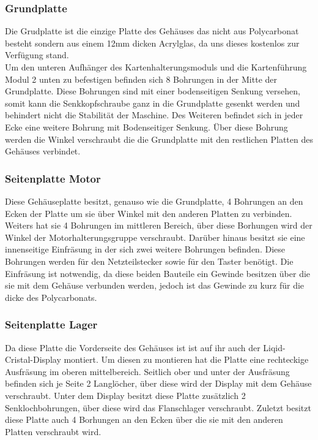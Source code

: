 \subsubsection{Grundplatte}
Die Grudplatte ist die einzige Platte des Gehäuses das nicht aus Polycarbonat besteht sondern aus einem 12mm dicken
Acrylglas, da uns dieses kostenlos zur Verfügung stand.\\
Um den unteren Aufhänger des Kartenhalterungsmoduls und die Kartenführung Modul 2 unten zu befestigen befinden sich 8
Bohrungen in der Mitte der Grundplatte. Diese Bohrungen sind mit einer bodenseitigen Senkung versehen, somit kann die
Senkkopfschraube ganz in die Grundplatte gesenkt werden und behindert nicht die Stabilität der Maschine.
Des Weiteren befindet sich in jeder Ecke eine weitere Bohrung mit Bodenseitiger Senkung. Über diese Bohrung werden die
Winkel verschraubt die die Grundplatte mit den restlichen Platten des Gehäuses verbindet.

\subsubsection{Seitenplatte Motor}
Diese Gehäuseplatte besitzt, genauso wie die Grundplatte, 4 Bohrungen an den Ecken der Platte um sie über Winkel
mit den anderen Platten zu verbinden. Weiters hat sie 4 Bohrungen im mittleren Bereich, über diese Borhungen wird
der Winkel der Motorhalterungsgruppe verschraubt. Darüber hinaus besitzt sie eine innenseitige Einfräsung in der sich
zwei weitere Bohrungen befinden. Diese Bohrungen werden für den Netzteilstecker sowie für den Taster benötigt.
Die Einfräsung ist notwendig, da diese beiden Bauteile ein Gewinde besitzen über die sie mit dem Gehäuse verbunden werden,
jedoch ist das Gewinde zu kurz für die dicke des Polycarbonats.

\subsubsection{Seitenplatte Lager}
Da diese Platte die Vorderseite des Gehäuses ist ist auf ihr auch der Liqid-Cristal-Display montiert. Um diesen zu montieren
hat die Platte eine rechteckige Ausfräsung im oberen mittelbereich. Seitlich ober und unter der Ausfräsung befinden sich
je Seite 2 Langlöcher, über diese wird der Display mit dem Gehäuse verschraubt.
Unter dem Display besitzt diese Platte zusätzlich 2 Senklochbohrungen, über diese wird das Flanschlager verschraubt.
Zuletzt besitzt diese Platte auch 4 Borhungen an den Ecken über die sie mit den anderen Platten verschraubt wird.

